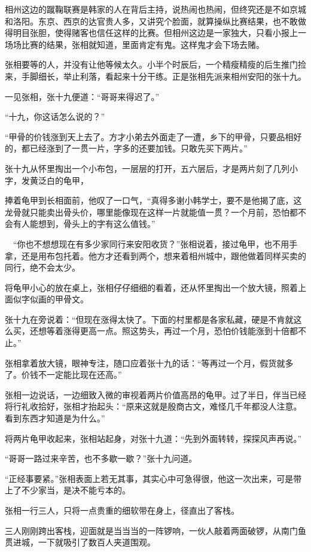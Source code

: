 相州这边的蹴鞠联赛是韩家的人在背后主持，说热闹也热闹，但终究还是不如京城和洛阳。东京、西京的达官贵人多，又讲究个脸面，就算操纵比赛结果，也不敢做得明目张胆，使得赌客也信任这样的比赛。但相州这边是一家独大，只看小报上一场场比赛的结果，张相就知道，里面肯定有鬼。这样鬼才会下场去赌。

张相要等的人，并没有让他等候太久。小半个时辰后，一个精瘦精瘦的后生推门捡来，手脚细长，举止利落，看起来十分干练。正是张相先派来相州安阳的张十九。

一见张相，张十九便道：“哥哥来得迟了。”

“十九，你这话怎么说的？”

“甲骨的价钱涨到天上去了。方才小弟去外面走了一遭，乡下的甲骨，只要品相好的，都已经涨到了一贯一片，字多的还要加钱。只敢先买下两片。”

张十九从怀里掏出一个小布包，一层层的打开，五六层后，才是两片刻了几列小字，发黄泛白的龟甲，

捧着龟甲到长相面前，他叹了一口气，“真得多谢小韩学士，要不是他揭了底，这龙骨就只能卖出骨头价，哪里能像现在这样一片就能值一贯？一个月前，恐怕都不会有人能想到，骨头上的字有这么值钱。”

　“你也不想想现在有多少家同行来安阳收货？”张相说着，接过龟甲，也不用手拿，还是用布包托着。他方才还看到两个，想来着相州城中，跟他做着同样买卖的同行，绝不会太少。

将龟甲小心的放在桌上，张相仔仔细细的看着，还从怀里掏出一个放大镜，照着上面似字似画的甲骨文。

张十九在旁说着：“但现在涨得太快了。下面的村里都是各家私藏，硬是不肯就这么买，还想等着涨得更高一点。照这势头，再过一个月，恐怕价钱能涨到十倍都不止。”

张相拿着放大镜，眼神专注，随口应着张十九的话：“等再过一个月，假货就多了。价钱不一定能比现在还高。”

张相一边说话，一边细致入微的审视着两片价值高昂的龟甲。过了半日，伴当已经将行礼收拾好，张相才抬起头：“原来这就是殷商古文，难怪几千年都没人注意。看到东西才知道是为什么。”

将两片龟甲收起来，张相站起身，对张十九道：“先到外面转转，探探风声再说。”

“哥哥一路过来辛苦，也不多歇一歇？”张十九问道。

“正经事要紧。”张相表面上若无其事，其实心中可急得很，他这一次出来，可是带上了不少家当，是决不能亏本的。

张相一行三人，只将一点贵重的细软带在身上，径直出了客栈。

三人刚刚跨出客栈，迎面就是当当当的一阵锣响，一伙人敲着两面破锣，从南门鱼贯进城，一下就吸引了数百人夹道围观。

